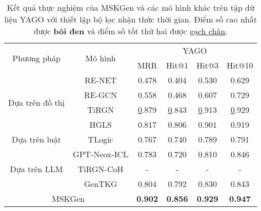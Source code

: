 \begin{table}
\caption{Kết quả thực nghiệm của MSKGen và các mô hình khác trên tập dữ liệu YAGO với thiết lập bộ lọc nhận thức thời gian. 
Điểm số cao nhất được \textbf{bôi đen} và điểm số tốt thứ hai được \underline{gạch chân}.}
\label{tab:table56}
\begin{adjustbox}{width=\textwidth}
\begin{tabular}{|cc|cccc|}
\hline
\multicolumn{1}{|c|}{\multirow{2}{*}{Phương pháp}}     & \multirow{2}{*}{Mô hình} & \multicolumn{4}{c|}{YAGO}                                                                           \\ \cline{3-6} 
\multicolumn{1}{|c|}{}                                 &                          & \multicolumn{1}{c|}{MRR} & \multicolumn{1}{c|}{Hit@1} & \multicolumn{1}{c|}{Hit@3} & Hit@10         \\ \hline
\multicolumn{1}{|c|}{\multirow{4}{*}{Dựa trên đồ thị}} & RE-NET                   & 0.478                    & 0.404                      & 0.530                      & 0.629          \\ \cline{2-2}
\multicolumn{1}{|c|}{}                                 & RE-GCN                   & 0.558                    & 0.468                      & 0.607                      & 0.729          \\ \cline{2-2}
\multicolumn{1}{|c|}{}                                 & TiRGN                    & {\ul 0.879}              & {\ul 0.843}                & {\ul 0.913}                & {\ul 0.929}    \\ \cline{2-2}
\multicolumn{1}{|c|}{}                                 & HGLS                     & 0.817                    & 0.806                      & 0.901                      & 0.919          \\ \hline
\multicolumn{1}{|c|}{Dựa trên luật}                    & TLogic                   & 0.767                    & 0.740                      & 0.789                      & 0.791          \\ \hline
\multicolumn{1}{|c|}{\multirow{3}{*}{Dựa trên LLM}}    & GPT-Neox-ICL             & 0.783                    & 0.720                      & 0.810                      & 0.846          \\ \cline{2-2}
\multicolumn{1}{|c|}{}                                 & TiRGN-CoH                & -                        & -                          & -                          & -              \\ \cline{2-2}
\multicolumn{1}{|c|}{}                                 & GenTKG                   & 0.804                    & 0.792                      & 0.830                      & 0.843          \\ \hline
\multicolumn{2}{|c|}{MSKGen}                                                      & \textbf{0.902}           & \textbf{0.856}             & \textbf{0.929}             & \textbf{0.947} \\ \hline
\end{tabular}
\end{adjustbox}  
\end{table}
\vspace{-5mm}

